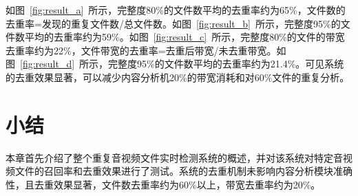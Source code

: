 如图~\ref{fig:result_a}~所示，完整度80\%的文件数平均的去重率约为65\%，文件数的去重率=发现的重复文件数/总文件数。如图~\ref{fig:result_b}~所示，完整度95\%的文件数平均的去重率约为59\%。如图~\ref{fig:result_c}~所示，完整度80\%的文件的带宽去重率约为22\%，文件带宽的去重率=去重后带宽/未去重带宽。如图~\ref{fig:result_d}~所示，完整度95\%的文件数平均的去重率约为21.4\%。可见系统的去重效果显著，可以减少内容分析机20\%的带宽消耗和对60\%文件的重复分析。

\section{小结}
本章首先介绍了整个重复音视频文件实时检测系统的概述，并对该系统对特定音视频文件的召回率和去重效果进行了测试。系统的去重机制未影响内容分析模块准确性，且去重效果显著，文件数去重率约为60\%以上，带宽去重率约为20\%。

